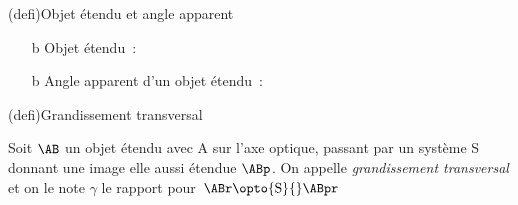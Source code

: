 \documentclass[../../main/main.tex]{subfiles}
\begin{document}
\begin{tcb*}[label=def:objet](defi){Objet étendu et angle apparent}
	\begin{itemize}[label=$\diamond$, leftmargin=10pt]
		\item[b]{Objet étendu}~: %
		\item[b]{Angle apparent} d'un objet étendu~: %
	\end{itemize}
\end{tcb*}
\begin{tcb*}[label=def:grand, sidebyside](defi){Grandissement transversal}

	Soit $\AB$ un objet étendu avec A sur l'axe optique, passant par
	un système S donnant une image elle aussi étendue $\ABp$. On
	appelle \textit{grandissement transversal} et on le note $\gamma$ le
	rapport
	\psw{%
		\[
			\boxed{\gamma = \frac{\ABp}{\AB}}
		\]
	}%
	pour $\ABr \opto{\rm  S}{} \ABpr$
	\tcblower
	\begin{center}
    \vspace{-15pt}
	\end{center}
\end{tcb*}
\end{document}
